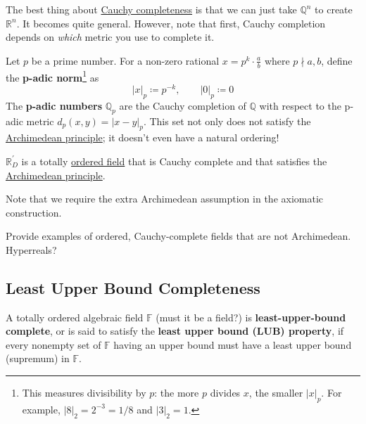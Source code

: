  The best thing about \hyperref[def:cauchy-completeness]{Cauchy completeness} is that we can just take $\mathbb{Q}^n$ to create $\mathbb{R}^n$. It becomes quite general. However, note that first, Cauchy completion depends on \textit{which} metric you use to complete it. 

  \begin{example}
    \label{ex:p-adic-numbers}
    Let $p$ be a prime number. For a non-zero rational $x = p^k \cdot \frac{a}{b}$ where $p \nmid a, b$, define the \textbf{p-adic norm}\footnote{This measures divisibility by $p$: the more $p$ divides $x$, the smaller $|x|_p$. For example, $|8|_2 = 2^{-3} = 1/8$ and $|3|_2 = 1$.} as 
    \begin{equation}
      |x|_p \coloneqq p^{-k}, \qquad |0|_p \coloneqq 0
    \end{equation}
    The \textbf{p-adic numbers} $\mathbb{Q}_p$ are the Cauchy completion of $\mathbb{Q}$ with respect to the p-adic metric $d_p(x,y) = |x - y|_p$. This set not only does not satisfy the \hyperref[def:archimedean-principle]{Archimedean principle}; it doesn't even have a natural ordering! 
  \end{example} 

  \begin{definition}
    \label{def:axiomatic-construction-of-cauchy-reals}
    $\mathbb{R}_D^\prime$ is a totally \hyperref[alg-def:ordered-field]{ordered field} that is Cauchy complete and that satisfies the \hyperref[def:archimedean-principle]{Archimedean principle}.
  \end{definition}

  Note that we require the extra Archimedean assumption in the axiomatic construction. 

  \begin{example}
    \label{ex:ordered-cauchy-complete-fields-that-are-not}
    Provide examples of ordered, Cauchy-complete fields that are not Archimedean. Hyperreals? 
  \end{example}

\subsection{Least Upper Bound Completeness}

  \begin{definition}
    \label{def:least-upper-bound-property}
    A totally ordered algebraic field $\mathbb{F}$ (must it be a field?) is \textbf{least-upper-bound complete}, or is said to satisfy the \textbf{least upper bound (LUB) property}, if every nonempty set of $\mathbb{F}$ having an upper bound must have a least upper bound (supremum) in $\mathbb{F}$. 
  \end{definition} 

